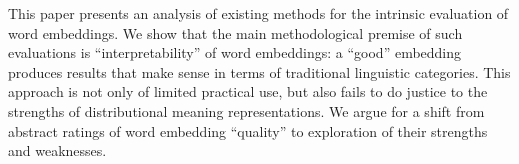 This paper presents an analysis of existing methods for the intrinsic evaluation of word embeddings. We show that the main methodological premise of such evaluations is ``interpretability'' of word embeddings: a ``good'' embedding produces results that make sense in terms of traditional linguistic categories. This approach is not only of limited practical use, but also fails to do justice to the strengths of distributional meaning representations. We argue for a shift from abstract ratings of word embedding ``quality'' to exploration of their strengths and weaknesses.
